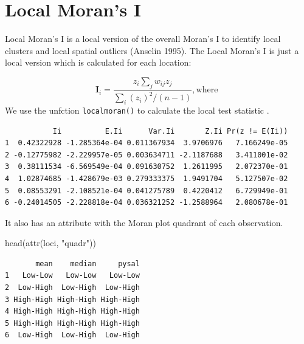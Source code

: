 \documentclass[
  letterpaper,
  DIV=11,
  numbers=noendperiod]{scrreprt}
\newenvironment{Shaded}{\begin{snugshade}}{\end{snugshade}}
\newcommand{\AttributeTok}[1]{\textcolor[rgb]{0.40,0.45,0.13}{#1}}
\newcommand{\FunctionTok}[1]{\textcolor[rgb]{0.28,0.35,0.67}{#1}}
\newcommand{\NormalTok}[1]{\textcolor[rgb]{0.00,0.23,0.31}{#1}}
\newcommand{\OtherTok}[1]{\textcolor[rgb]{0.00,0.23,0.31}{#1}}
\newcommand{\SpecialCharTok}[1]{\textcolor[rgb]{0.37,0.37,0.37}{#1}}
\newcommand{\StringTok}[1]{\textcolor[rgb]{0.13,0.47,0.30}{#1}}
\begin{document}
\hypertarget{local-morans-i}{%
\section{Local Moran's I}\label{local-morans-i}}

Local Moran's I is a local version of the overall Moran's I to identify
local clusters and local spatial outliers (Anselin 1995). The Local
Moran's I is just a local version which is calculated for each location:

\[      
        \begin{equation} 
        \boldsymbol{\mathbf{I}}_i  =  
        \frac{z_i \sum_j w_{ij}z_j}
            {\sum_i (z_i)^2 / (n-1)}, \text{where }
        \end{equation}
\] We use the unfction \texttt{localmoran()} to calculate the local test
statistic .

\begin{Shaded}
\end{Shaded}

\begin{verbatim}
           Ii          E.Ii      Var.Ii       Z.Ii Pr(z != E(Ii))
1  0.42322928 -1.285364e-04 0.011367934  3.9706976   7.166249e-05
2 -0.12775982 -2.229957e-05 0.003634711 -2.1187688   3.411001e-02
3  0.38111534 -6.569549e-04 0.091630752  1.2611995   2.072370e-01
4  1.02874685 -1.428679e-03 0.279333375  1.9491704   5.127507e-02
5  0.08553291 -2.108521e-04 0.041275789  0.4220412   6.729949e-01
6 -0.24014505 -2.228818e-04 0.036321252 -1.2588964   2.080678e-01
\end{verbatim}

It also has an attribute with the Moran plot quadrant of each
observation.

\begin{Shaded}
\begin{Highlighting}[]
\FunctionTok{head}\NormalTok{(}\FunctionTok{attr}\NormalTok{(loci, }\StringTok{"quadr"}\NormalTok{))}
\end{Highlighting}
\end{Shaded}

\begin{verbatim}
       mean    median     pysal
1   Low-Low   Low-Low   Low-Low
2  Low-High  Low-High  Low-High
3 High-High High-High High-High
4 High-High High-High High-High
5 High-High High-High High-High
6  Low-High  Low-High  Low-High
\end{verbatim}
\end{document}
